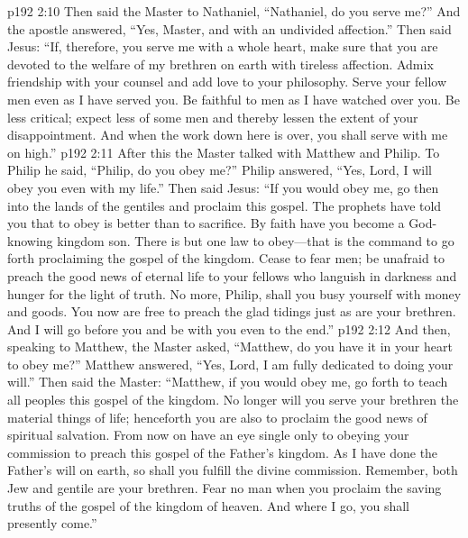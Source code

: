 \vs p192 2:10 Then said the Master to Nathaniel, \textcolor{ubdarkred}{“Nathaniel, do you serve me?”} And the apostle answered, “Yes, Master, and with an undivided affection.” Then said Jesus: \textcolor{ubdarkred}{“If, therefore, you serve me with a whole heart, make sure that you are devoted to the welfare of my brethren on earth with tireless affection. Admix friendship with your counsel and add love to your philosophy. Serve your fellow men even as I have served you. Be faithful to men as I have watched over you. Be less critical; expect less of some men and thereby lessen the extent of your disappointment. And when the work down here is over, you shall serve with me on high.”}
\pc \vs p192 2:11 After this the Master talked with Matthew and Philip. To Philip he said, \textcolor{ubdarkred}{“Philip, do you obey me?”} Philip answered, “Yes, Lord, I will obey you even with my life.” Then said Jesus: \textcolor{ubdarkred}{“If you would obey me, go then into the lands of the gentiles and proclaim this gospel. The prophets have told you that to obey is better than to sacrifice. By faith have you become a God\hyp{}knowing kingdom son. There is but one law to obey---that is the command to go forth proclaiming the gospel of the kingdom. Cease to fear men; be unafraid to preach the good news of eternal life to your fellows who languish in darkness and hunger for the light of truth. No more, Philip, shall you busy yourself with money and goods. You now are free to preach the glad tidings just as are your brethren. And I will go before you and be with you even to the end.”}
\vs p192 2:12 And then, speaking to Matthew, the Master asked, \textcolor{ubdarkred}{“Matthew, do you have it in your heart to obey me?”} Matthew answered, “Yes, Lord, I am fully dedicated to doing your will.” Then said the Master: \textcolor{ubdarkred}{“Matthew, if you would obey me, go forth to teach all peoples this gospel of the kingdom. No longer will you serve your brethren the material things of life; henceforth you are also to proclaim the good news of spiritual salvation. From now on have an eye single only to obeying your commission to preach this gospel of the Father’s kingdom. As I have done the Father’s will on earth, so shall you fulfill the divine commission. Remember, both Jew and gentile are your brethren. Fear no man when you proclaim the saving truths of the gospel of the kingdom of heaven. And where I go, you shall presently come.”}
